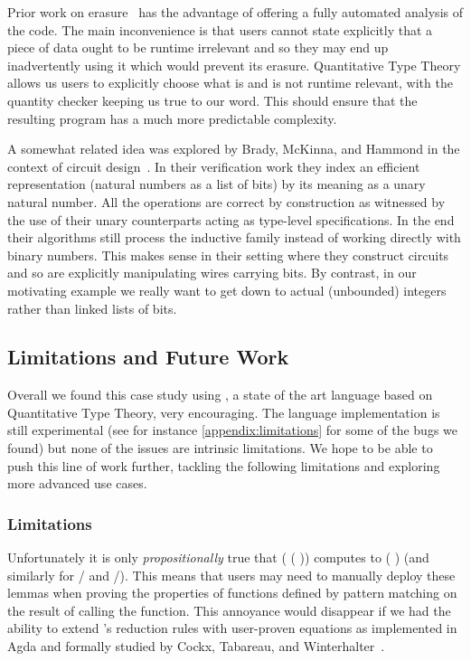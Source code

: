 Prior work on erasure~\cite{DBLP:journals/pacmpl/Tejiscak20} has the advantage of
offering a fully automated analysis of the code. The main inconvenience is that users
cannot state explicitly that a piece of data ought to be runtime irrelevant and so
they may end up inadvertently using it which would prevent its erasure.
%
Quantitative Type Theory allows us users to explicitly choose what is and is not
runtime relevant, with the quantity checker keeping us true to our word.
%
This should ensure that the resulting program has a much more predictable complexity.

A somewhat related idea was explored by Brady, McKinna, and Hammond in the context of
circuit design~\cite{DBLP:conf/sfp/BradyMH07}. In their verification work they index
an efficient representation (natural numbers as a list of bits) by its meaning as a
unary natural number. All the operations are correct by construction as witnessed by
the use of their unary counterparts acting as type-level specifications.
%
In the end their algorithms still process the inductive family instead of working
directly with binary numbers. This makes sense in their setting where they construct
circuits and so are explicitly manipulating wires carrying bits.
%
By contrast, in our motivating example we really want to get down to actual (unbounded)
integers rather than linked lists of bits.


\subsection{Limitations and Future Work}

Overall we found this case study using \idris{}, a state of the art language
based on Quantitative Type Theory, very encouraging.
%
The language implementation is still experimental (see for instance
\cref{appendix:limitations} for some of the bugs we found) but none of
the issues are intrinsic limitations.
%
We hope to be able to push this line of work further, tackling the following
limitations and exploring more advanced use cases.

\subsubsection{Limitations}

Unfortunately it is only \emph{propositionally} true that
( (  ))
computes to (  ) (and similarly for
/ and /).
%
This means that users may need to manually deploy these lemmas when proving the
properties of functions defined by pattern matching on the result of calling the
 function.
%
This annoyance would disappear if we had the ability to extend \idris{}'s reduction rules
with user-proven equations as implemented in Agda and formally studied
by Cockx, Tabareau, and Winterhalter~\cite{DBLP:journals/pacmpl/CockxTW21}.

